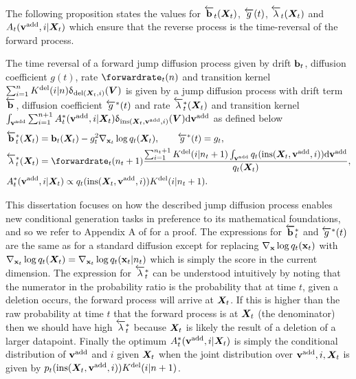 The following proposition states the values for $\overleftarrow{\mathbf{b}}_t({\bm{X}}_t)$, $\overleftarrow{g}(t)$, $\overleftarrow{\lambda}_t({\bm{X}}_t)$ and $A_t({\mathbf{v}}^{\textup{add}}, i | {\bm{X}}_t)$ which ensure that the reverse process is the time-reversal of the forward process.
\begin{proposition}
\label{prop:time_reversal}
The time reversal of a forward jump diffusion process given by drift ${\mathbf{b}}_t$, diffusion coefficient $g(t)$, rate $\forwardrate_t(n)$ and transition kernel $\sum_{i=1}^n K^{\textup{del}}(i | n) \updelta_{\textup{del}({\bm{X}}_t, i)}({\bm{V}})$ is given by a jump diffusion process with drift term $\overleftarrow{\mathbf{b}}$, diffusion coefficient $\overleftarrow{g}^*(t)$ and rate $\overleftarrow{\lambda}_t^*({\bm{X}}_t)$ and transition kernel $\int_{{\mathbf{v}}^{\textup{add}}} \sum_{i=1}^{n+1}  A^*_t({\mathbf{v}}^{\textup{add}}, i | {\bm{X}}_t) \updelta_{\textup{ins}({\bm{X}}_t, {\mathbf{v}}^{\textup{add}}, i)}({\bm{V}}) \mathrm{d} {\mathbf{v}}^{\textup{add}}$ as defined below
\begin{align}
    &\backwarddrift_{t}^*(\mX_t) = \rvb_{t}(\mX_t) - g_t^2 \nabla_{\rvx_t} \log q_t(\mX_t), \qquad \backwarddiffcoeff^*(t) = g_{t},\\
    & \backwardrate_{t}^*(\mX_t) = \forwardrate_{t}(n_t+1) \frac{ \sum_{i=1}^{n_t+1} \delidxdist(i | n_t+1) \int_{\yadd} q_t(\textup{ins}(\mX_t, \yadd, i)) \rmd \yadd }{q_t(\mX_t)},\\
    & \autonet_{t}^*( \yadd, i | \mX_t) \propto q_{t}(\textup{ins}(\mX_t, \yadd, i) ) \delidxdist(i| n_t+1).
\end{align}
\end{proposition}
This dissertation focuses on how the described jump diffusion process enables new conditional generation tasks in preference to its mathematical foundations, and so we refer to Appendix A of \citet{campbell2024trans} for a proof. The expressions for $\overleftarrow{\mathbf{b}}_t^*$ and $\overleftarrow{g}^*(t)$ are the same as for a standard diffusion except for replacing $\nabla_{{\mathbf{x}}} \log q_t({\mathbf{x}}_t)$ with $\nabla_{{\mathbf{x}}_t} \log q_t({\bm{X}}_t) = \nabla_{{\mathbf{x}}_t} \log q_t({\mathbf{x}}_t | n_t)$ which is simply the score in the current dimension.
The expression for $\overleftarrow{\lambda}_t^*$ can be understood intuitively by noting that the numerator in the probability ratio is the probability that at time $t$, given a deletion occurs, the forward process will arrive at ${\bm{X}}_t$. If this is higher than the raw probability at time $t$ that the forward process is at ${\bm{X}}_t$ (the denominator) then we should have high $\overleftarrow{\lambda}_t^*$ because ${\bm{X}}_t$ is likely the result of a deletion of a larger datapoint.
Finally the optimum $A^*_t({\mathbf{v}}^{\textup{add}}, i | {\bm{X}}_t)$ is simply the conditional distribution of ${\mathbf{v}}^{\textup{add}}$ and $i$ given ${\bm{X}}_t$ when the joint distribution over ${\mathbf{v}}^{\textup{add}}, i, {\bm{X}}_t$ is given by $p_{t}(\text{ins}({\bm{X}}_t, {\mathbf{v}}^{\textup{add}}, i) ) K^{\textup{del}}(i| n+1)$. 

